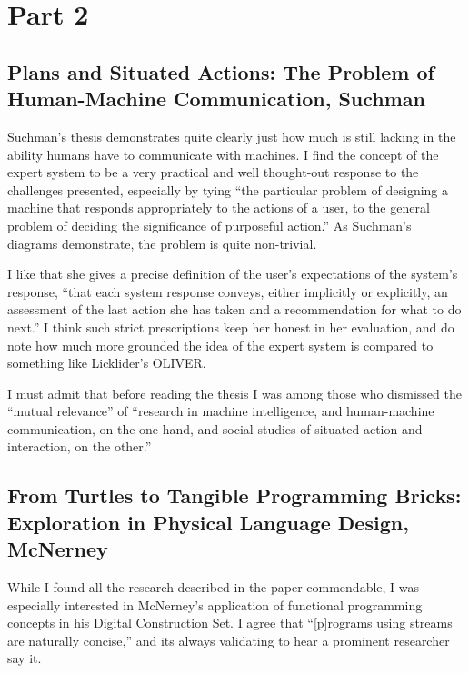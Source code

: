 \documentclass{abrice}
\begin{document}
\section{Part 2}

\subsection{Plans and Situated Actions: The Problem of Human-Machine
  Communication, Suchman}

Suchman's thesis demonstrates quite clearly just how much is still lacking in
the ability humans have to communicate with machines. I find the concept of the
expert system to be a very practical and well thought-out response to the
challenges presented, especially by tying ``the particular problem of designing
a machine that responds appropriately to the actions of a user, to the general
problem of deciding the significance of purposeful action.'' As Suchman's
diagrams demonstrate, the problem is quite non-trivial.

I like that she gives a precise definition of the user's expectations of the
system's response, ``that each system response conveys, either implicitly or
explicitly, an assessment of the last action she has taken and a recommendation
for what to do next.'' I think such strict prescriptions keep her honest in her
evaluation, and do note how much more grounded the idea of the expert system is
compared to something like Licklider's OLIVER\@.

I must admit that before reading the thesis I was among those who dismissed the
``mutual relevance'' of ``research in machine intelligence, and human-machine
communication, on the one hand, and social studies of situated action and
interaction, on the other.''

\subsection{From Turtles to Tangible Programming Bricks: Exploration in Physical
Language Design, McNerney}

While I found all the research described in the paper commendable, I was
especially interested in McNerney's application of functional programming
concepts in his Digital Construction Set. I agree that ``[p]rograms
using streams are naturally concise,'' and its always validating to hear a
prominent researcher say it.
\end{document}
